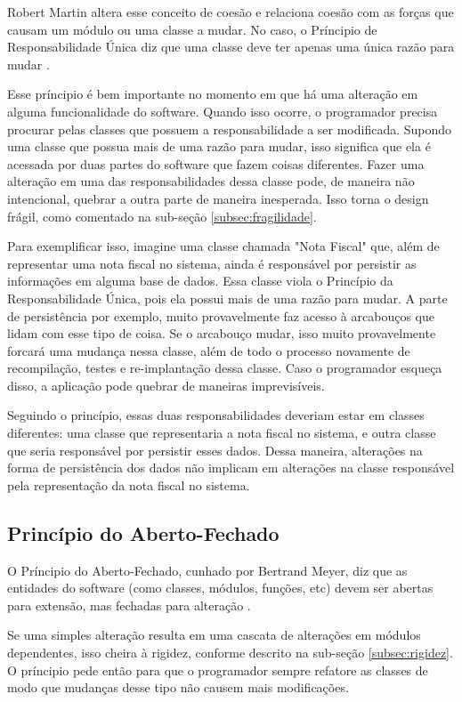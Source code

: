 Robert Martin altera esse conceito de coesão e relaciona coesão com as forças
que  causam um módulo ou uma classe a mudar. No caso, o Príncipio de
Responsabilidade Única diz que uma classe deve ter apenas uma única razão para 
mudar \cite{bob-martin}.

Esse príncipio é bem importante no momento em que há uma alteração em alguma 
funcionalidade do software. Quando isso ocorre, o programador precisa procurar 
pelas classes que possuem a responsabilidade a ser modificada. Supondo uma
classe  que possua mais de uma razão para mudar, isso significa que ela é
acessada  por duas partes do software que fazem coisas diferentes.  Fazer uma
alteração em uma das responsabilidades dessa classe pode, de maneira não
intencional, quebrar a outra parte de maneira inesperada. Isso torna o design
frágil, como comentado na sub-seção \ref{subsec:fragilidade}.

Para exemplificar isso, imagine uma classe chamada "Nota Fiscal" que, além de
representar uma nota fiscal no sistema, ainda é responsável por persistir as 
informações em alguma base de dados. Essa classe viola o Princípio da
Responsabilidade Única, pois ela possui mais de uma razão para mudar. A parte de
persistência por exemplo, muito provavelmente faz acesso à arcabouços que lidam 
com esse tipo de coisa. Se o arcabouço mudar, isso muito provavelmente forcará
uma  mudança nessa classe, além de todo o processo novamente de recompilação, 
testes e re-implantação dessa classe. Caso o programador esqueça disso, a
aplicação pode quebrar de maneiras imprevisíveis.

Seguindo o princípio, essas duas responsabilidades deveriam estar em classes 
diferentes: uma classe que representaria a nota fiscal no sistema, e outra
classe que seria responsável por persistir esses dados. Dessa maneira,
alterações na forma de persistência dos dados não implicam em alterações na 
classe responsável pela representação da nota fiscal no sistema.

\subsection{Princípio do Aberto-Fechado}
\label{subsec:ocp}

O Príncipio do Aberto-Fechado, cunhado por Bertrand Meyer, diz que as entidades
do software (como classes, módulos, funções, etc) devem ser abertas para
extensão, mas fechadas para alteração \cite{meyer-ocp}. 

Se uma simples alteração resulta em uma cascata de alterações em módulos
dependentes, isso cheira à rigidez, conforme descrito na sub-seção 
\ref{subsec:rigidez}. O príncipio pede então para que o programador sempre 
refatore as classes de modo que mudanças desse tipo não causem mais modificações.

